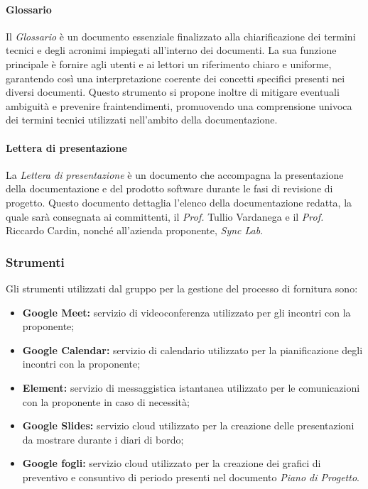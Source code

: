 \paragraph{Glossario}
Il \textit{Glossario} è un documento essenziale finalizzato alla chiarificazione dei termini tecnici e degli acronimi impiegati all'interno dei documenti. La sua funzione principale è fornire agli utenti e ai lettori un riferimento chiaro e uniforme, garantendo così una interpretazione coerente dei concetti specifici presenti nei diversi documenti. Questo strumento si propone inoltre di mitigare eventuali ambiguità e prevenire fraintendimenti, promuovendo una comprensione univoca dei termini tecnici utilizzati nell'ambito della documentazione.

\paragraph{Lettera di presentazione}
La \textit{Lettera di presentazione} è un documento che accompagna la presentazione della documentazione e del prodotto software durante le fasi di revisione di progetto. Questo documento dettaglia l'elenco della documentazione redatta, la quale sarà consegnata ai committenti, il \textit{Prof.} Tullio Vardanega e il \textit{Prof.} Riccardo Cardin, nonché all'azienda proponente, \textit{Sync Lab}.

\subsubsection{Strumenti}
Gli strumenti utilizzati dal gruppo per la gestione del processo di fornitura sono:
\begin{itemize}
    \item \textbf{Google Meet:}
    servizio di videoconferenza utilizzato per gli incontri con la proponente;
    \item \textbf{Google Calendar:}
    servizio di calendario utilizzato per la pianificazione degli incontri con la proponente;
    \item \textbf{Element:}
    servizio di messaggistica istantanea utilizzato per le comunicazioni con la proponente in caso di necessità;
    \item \textbf{Google Slides:}
    servizio cloud utilizzato per la creazione delle presentazioni da mostrare durante i diari di bordo;
    \item \textbf{Google fogli:} servizio cloud utilizzato per la creazione dei grafici di preventivo e consuntivo di periodo presenti nel documento \textit{Piano di Progetto}.
\end{itemize}


